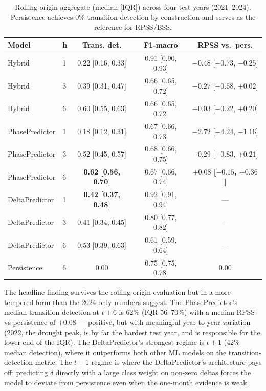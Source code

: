 \documentclass[11pt,letterpaper]{article}
\begin{document}
\begin{table}[H]
\centering
\small
\caption{Rolling-origin aggregate (median [IQR]) across four test years (2021--2024). Persistence achieves 0\% transition detection by construction and serves as the reference for RPSS/BSS.}
\label{tab:rolling}
\begin{tabular}{llccc}
\toprule
\textbf{Model} & \textbf{h} & \textbf{Trans. det.} & \textbf{F1-macro} & \textbf{RPSS vs.\ pers.} \\
\midrule
Hybrid          & 1 & 0.22 [0.16, 0.33] & 0.91 [0.90, 0.93] & $-0.48$ [$-0.73$, $-0.25$] \\
Hybrid          & 3 & 0.39 [0.31, 0.47] & 0.66 [0.65, 0.72] & $-0.27$ [$-0.58$, $+0.02$] \\
Hybrid          & 6 & 0.60 [0.55, 0.63] & 0.66 [0.65, 0.72] & $-0.03$ [$-0.22$, $+0.20$] \\
PhasePredictor  & 1 & 0.18 [0.12, 0.31] & 0.67 [0.66, 0.73] & $-2.72$ [$-4.24$, $-1.16$] \\
PhasePredictor  & 3 & 0.52 [0.45, 0.57] & 0.68 [0.66, 0.75] & $-0.29$ [$-0.83$, $+0.21$] \\
PhasePredictor  & 6 & \textbf{0.62 [0.56, 0.70]} & 0.67 [0.66, 0.74] & \textbf{$+0.08$ [$-0.15$, $+0.36$]} \\
DeltaPredictor  & 1 & \textbf{0.42 [0.37, 0.48]} & 0.92 [0.91, 0.94] & --- \\
DeltaPredictor  & 3 & 0.41 [0.34, 0.45] & 0.80 [0.77, 0.82] & --- \\
DeltaPredictor  & 6 & 0.53 [0.39, 0.63] & 0.61 [0.59, 0.64] & --- \\
Persistence     & 6 & 0.00 & 0.75 [0.75, 0.78] & 0.00 \\
\bottomrule
\end{tabular}
\end{table}

\noindent The headline finding survives the rolling-origin evaluation but in a more tempered form than the 2024-only numbers suggest. The PhasePredictor's median transition detection at $t\!+\!6$ is 62\% (IQR 56--70\%) with a median RPSS-vs-persistence of $+0.08$ --- positive, but with meaningful year-to-year variation (2022, the drought peak, is by far the hardest test year, and is responsible for the lower end of the IQR). The DeltaPredictor's strongest regime is $t\!+\!1$ (42\% median detection), where it outperforms both other ML models on the transition-detection metric. The $t\!+\!1$ regime is where the DeltaPredictor's architecture pays off: predicting $\delta$ directly with a large class weight on non-zero deltas forces the model to deviate from persistence even when the one-month evidence is weak.
\end{document}
